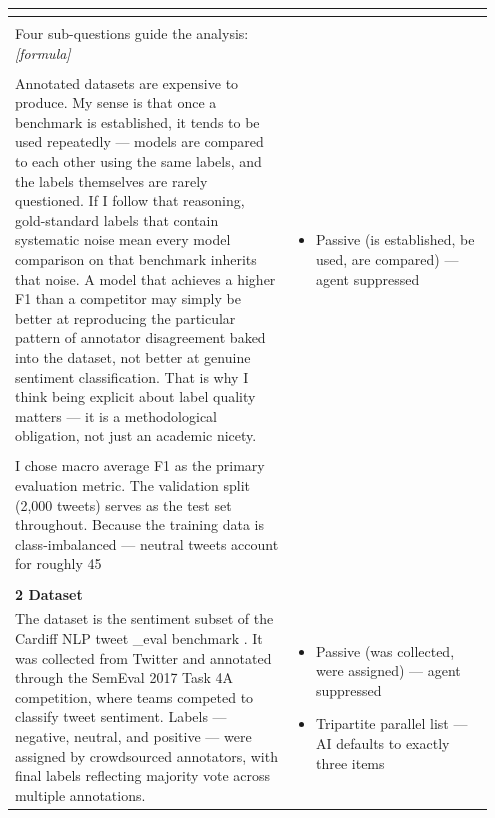 \documentclass[11pt]{article}
\begin{document}
\begin{longtable}{|p{0.55\linewidth}|p{0.40\linewidth}|}
\begin{itemize}[leftmargin=1em,itemsep=1pt,topsep=1pt,parsep=0pt]
\end{itemize} \\[2pt]
\hline
\rule[-3.5cm]{0pt}{3.5cm} & \\
\hline
Four sub-questions guide the analysis: \textit{[formula]} &  \\[2pt]
\hline
\rule[-3.5cm]{0pt}{3.5cm} & \\
\hline
Annotated datasets are expensive to produce. My sense is that once a benchmark is established, it tends to be used repeatedly --- models are compared to each other using the same labels, and the labels themselves are rarely questioned. If I follow that reasoning, gold-standard labels that contain systematic noise mean every model comparison on that benchmark inherits that noise. A model that achieves a higher F1 than a competitor may simply be better at reproducing the particular pattern of annotator disagreement baked into the dataset, not better at genuine sentiment classification. That is why I think being explicit about label quality matters --- it is a methodological obligation, not just an academic nicety. & \begin{itemize}[leftmargin=1em,itemsep=1pt,topsep=1pt,parsep=0pt]
  \item Passive (is established, be used, are compared) --- agent suppressed
\end{itemize} \\[2pt]
\hline
\rule[-3.5cm]{0pt}{3.5cm} & \\
\hline
I chose macro average F1 as the primary evaluation metric. The validation split (2,000 tweets) serves as the test set throughout. Because the training data is class-imbalanced --- neutral tweets account for roughly 45 &  \\[2pt]
\hline
\rule[-3.5cm]{0pt}{3.5cm} & \\
\hline
\textbf{2 Dataset}\\[4pt]
The dataset is the sentiment subset of the Cardiff NLP tweet \_eval benchmark . It was collected from Twitter and annotated through the SemEval 2017 Task 4A competition, where teams competed to classify tweet sentiment. Labels --- negative, neutral, and positive --- were assigned by crowdsourced annotators, with final labels reflecting majority vote across multiple annotations. & \begin{itemize}[leftmargin=1em,itemsep=1pt,topsep=1pt,parsep=0pt]
  \item Passive (was collected, were assigned) --- agent suppressed
  \item Tripartite parallel list --- AI defaults to exactly three items

\end{itemize}
\end{longtable}
\end{document}
